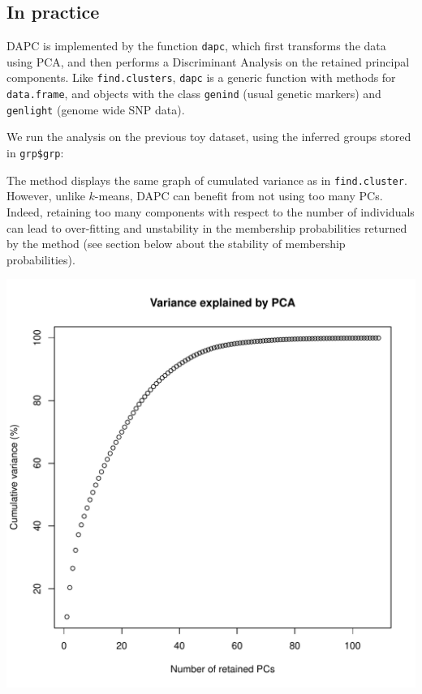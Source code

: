 \documentclass{article}
\begin{document}
\subsection{In practice}

DAPC is implemented by the function \texttt{dapc}, which first transforms the data using PCA, and
then performs a Discriminant Analysis on the retained principal components. Like
\texttt{find.clusters}, \texttt{dapc} is a generic function with methods for \texttt{data.frame}, and objects with
the class \texttt{genind} (usual genetic markers) and \texttt{genlight} (genome wide SNP data).

We run the analysis on the previous toy dataset, using the inferred groups stored in \texttt{grp\$grp}:

\begin{Schunk}
\end{Schunk}

The method displays the same graph of cumulated variance as in \texttt{find.cluster}. However, unlike
$k$-means, DAPC can benefit from not using too many PCs. Indeed, retaining too many components with
respect to the number of individuals can lead to over-fitting and unstability in the membership
probabilities returned by the method (see section below about the stability of membership probabilities).

\begin{center}
  \includegraphics[width=.7\textwidth]{findclust-pca.pdf}
\end{center}
\end{document}
